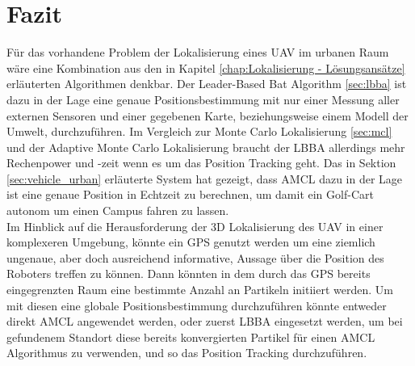 \chapter{\textbf{Fazit}}\label{chap:Fazit}

Für das vorhandene Problem der Lokalisierung eines UAV im urbanen Raum wäre eine Kombination aus den in Kapitel \ref{chap:Lokalisierung - Lösungsansätze} erläuterten Algorithmen denkbar. Der Leader-Based Bat Algorithm \ref{sec:lbba} ist dazu in der Lage eine genaue Positionsbestimmung mit nur einer Messung aller externen Sensoren und einer gegebenen Karte, beziehungsweise einem Modell der Umwelt, durchzuführen. Im Vergleich zur Monte Carlo Lokalisierung \ref{sec:mcl} und der Adaptive Monte Carlo Lokalisierung braucht der LBBA allerdings mehr Rechenpower und -zeit wenn es um das Position Tracking geht.
Das in  Sektion \ref{sec:vehicle_urban} erläuterte System hat gezeigt, dass AMCL dazu in der Lage ist eine genaue Position in Echtzeit zu berechnen, um damit ein Golf-Cart autonom um einen Campus fahren zu lassen.\\
Im Hinblick auf die Herausforderung der 3D Lokalisierung des UAV in einer komplexeren Umgebung, könnte ein GPS genutzt werden um eine ziemlich ungenaue, aber doch ausreichend informative, Aussage über die Position des Roboters treffen zu können. Dann könnten in dem durch das GPS bereits eingegrenzten Raum eine bestimmte Anzahl an Partikeln initiiert werden. Um mit diesen eine globale Positionsbestimmung durchzuführen könnte entweder direkt AMCL angewendet werden, oder zuerst LBBA eingesetzt werden, um bei gefundenem Standort diese bereits konvergierten Partikel für einen AMCL Algorithmus zu verwenden, und so das Position Tracking durchzuführen.